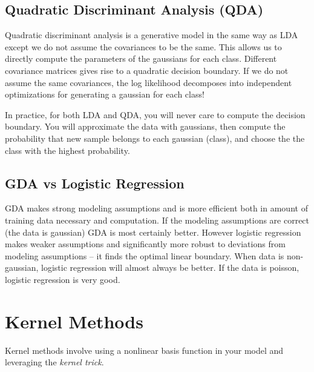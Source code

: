 \documentclass[11pt]{article}
\begin{document}
\subsection{Quadratic Discriminant Analysis (QDA)}
Quadratic discriminant analysis is a generative model in the same way as LDA except we do not assume the covariances to be the same. This allows us to directly compute the parameters of the gaussians for each class. Different covariance matrices gives rise to a quadratic decision boundary. If we do not assume the same covariances, the log likelihood decomposes into independent optimizations for generating a gaussian for each class! 

In practice, for both LDA and QDA, you will never care to compute the decision boundary. You will approximate the data with gaussians, then compute the probability that new sample belongs to each gaussian (class), and choose the the class with the highest probability. 

\subsection{GDA vs Logistic Regression}
GDA makes strong modeling assumptions and is more efficient both in amount of training data necessary and computation. If the modeling assumptions are correct (the data is gaussian) GDA is most certainly better. However logistic regression makes weaker assumptions and significantly more robust to deviations from modeling assumptions -- it finds the optimal linear boundary. When data is non-gaussian, logistic regression will almost always be better. If the data is poisson, logistic regression is very good. 

\section{Kernel Methods}
Kernel methods involve using a nonlinear basis function in your model and leveraging the {\it kernel trick}. 
\end{document}
